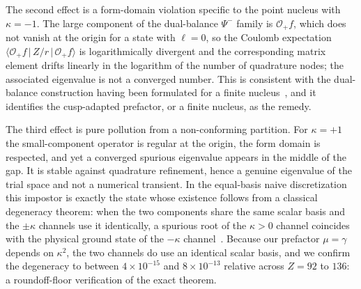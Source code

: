 \documentclass[aps,pra,twocolumn,superscriptaddress,showpacs,floatfix,longbibliography]{revtex4-2}
\newcommand{\Op}{\ensuremath{\mathcal{O}}}
\begin{document}
The second effect is a form-domain violation specific to the point nucleus
with $\kappa=-1$. The large component of the dual-balance $\Psi^{-}$ family
is $\Op_{+}f$, which does not vanish at the origin for a state with
$\ell=0$, so the Coulomb expectation $\langle\Op_{+}f\,|\,Z/r\,|\,
\Op_{+}f\rangle$ is logarithmically divergent and the corresponding matrix
element drifts linearly in the logarithm of the number of quadrature
nodes; the associated eigenvalue is not a converged number. This is
consistent with the dual-balance construction having been formulated for
a finite nucleus~\cite{Shabaev2004}, and it identifies the cusp-adapted
prefactor, or a finite nucleus, as the remedy.

The third effect is pure pollution from a non-conforming partition. For
$\kappa=+1$ the small-component operator is regular at the origin, the
form domain is respected, and yet a converged spurious eigenvalue appears
in the middle of the gap. It is stable against quadrature refinement,
hence a genuine eigenvalue of the trial space and not a numerical
transient. In the equal-basis naive discretization this impostor is
exactly the state whose existence follows from a classical degeneracy
theorem: when the two components share the same scalar basis and the
$\pm\kappa$ channels use it identically, a spurious root of the $\kappa>0$
channel coincides with the physical ground state of the $-\kappa$
channel~\cite{DrakeGoldman1981,Tupitsyn2008,Pestka2003}. Because our
prefactor $\mu=\gamma$ depends on $\kappa^{2}$, the two channels do use an
identical scalar basis, and we confirm the degeneracy to between
$4\times10^{-15}$ and $8\times10^{-13}$ relative across $Z=92$ to $136$: a
roundoff-floor verification of the exact theorem.
\end{document}
